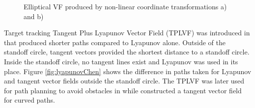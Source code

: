 \documentclass[numbered,pdftex]{ohio-etd}
\begin{document}
\begin{figure}[h]
	\begin{subfigmatrix}{2}%
		\centering
	\end{subfigmatrix}
	\caption{Elliptical VF produced by non-linear coordinate transformations a)\cite{frew_cooperative_2007} and b) \cite{frew_lyapunov_nodate}}
	\label{fig:lyapunovFrew}
\end{figure}

Target tracking Tangent Plus Lyapunov Vector Field (TPLVF) was introduced in \cite{chen_tracking_2009} that produced shorter paths compared to Lyapunov alone. Outside of the standoff circle, tangent vectors provided the shortest distance to a standoff circle. Inside the standoff circle, no tangent lines exist and Lyapunov was used in its place. Figure \ref{fig:lyapunovChen} shows the difference in paths taken for Lyapunov and tangent vector fields outside the standoff circle. The TPLVF was later used for path planning to avoid obstacles in \cite{chen_uav_2013} while \cite{liang_tangent_2017} constructed a tangent vector field for curved paths.
\end{document}
